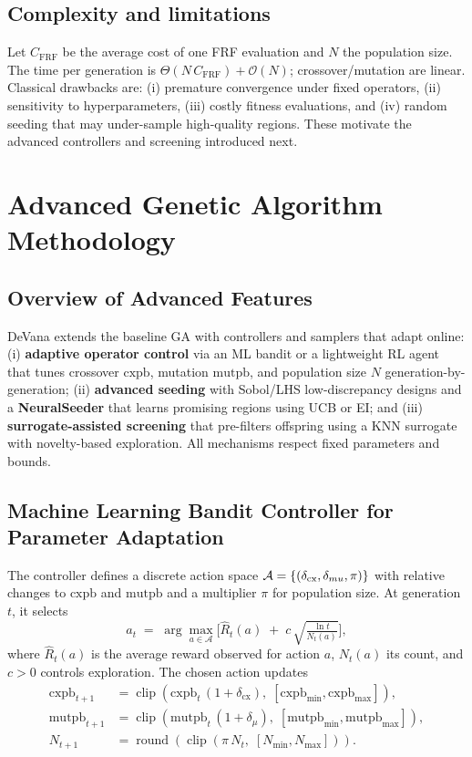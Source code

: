 \documentclass[12pt,a4paper]{article}
\begin{document}
    \subsection{Complexity and limitations}
    Let $C_{\text{FRF}}$ be the average cost of one FRF evaluation and $N$ the population size. The time per generation is $\Theta(N\,C_{\text{FRF}})+\mathcal{O}(N)$; crossover/mutation are linear. Classical drawbacks are: (i) premature convergence under fixed operators, (ii) sensitivity to hyperparameters, (iii) costly fitness evaluations, and (iv) random seeding that may under-sample high-quality regions. These motivate the advanced controllers and screening introduced next.




\section{Advanced Genetic Algorithm Methodology}
    \subsection{Overview of Advanced Features}
    DeVana extends the baseline GA with controllers and samplers that adapt online: (i) \textbf{adaptive operator control} via an ML bandit or a lightweight RL agent that tunes crossover $\text{cxpb}$, mutation $\text{mutpb}$, and population size $N$ generation-by-generation; (ii) \textbf{advanced seeding} with Sobol/LHS low-discrepancy designs and a \textbf{NeuralSeeder} that learns promising regions using UCB or EI; and (iii) \textbf{surrogate-assisted screening} that pre-filters offspring using a KNN surrogate with novelty-based exploration. All mechanisms respect fixed parameters and bounds.

    \subsection{Machine Learning Bandit Controller for Parameter Adaptation}
    The controller defines a discrete action space $\mathcal{A}=\{(\delta_{\text{cx}},\delta_{\\mu},\pi)\}$ with relative changes to $\text{cxpb}$ and $\text{mutpb}$ and a multiplier $\pi$ for population size. At generation $t$, it selects
    \begin{equation}
        a_t\;=\;\arg\max_{a\in\mathcal{A}}\Big[ \hat{R}_t(a)\; +\; c\,\sqrt{\tfrac{\ln t}{N_t(a)}} \Big], \label{Eq.ucb}
    \end{equation}
    where $\hat{R}_t(a)$ is the average reward observed for action $a$, $N_t(a)$ its count, and $c>0$ controls exploration. The chosen action updates
    \begin{align}
        \text{cxpb}_{t+1}&=\operatorname{clip}(\text{cxpb}_t\,(1+\delta_{\text{cx}}),\;[\text{cxpb}_{\min},\text{cxpb}_{\max}]),\\
        \text{mutpb}_{t+1}&=\operatorname{clip}(\text{mutpb}_t\,(1+\delta_{\mu}),\;[\text{mutpb}_{\min},\text{mutpb}_{\max}]),\\
        N_{t+1}&=\operatorname{round}(\operatorname{clip}(\pi\,N_t,\;[N_{\min},N_{\max}])).
    \end{align}
\end{document}
